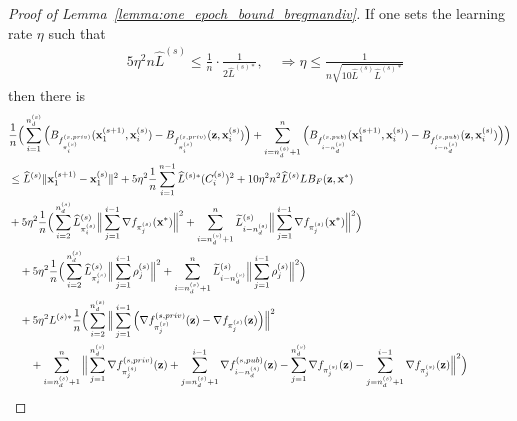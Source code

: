 \begin{proof}[Proof of Lemma~\ref{lemma:one_epoch_bound_bregmandiv}]
    If one sets the learning rate $\eta$ such that
    \begin{align}
        &5 \eta^2 n \widehat{L}^{(s)} \leq \frac{1}{n} \cdot \frac{1}{2 \widehat{L}^{(s)*}}, \quad
        \Rightarrow \eta \leq \frac{1}{n\sqrt{10 \widehat{L}^{(s)} \widehat{L}^{(s)*}}}
    \end{align}
    then there is
    \begin{align}
        &\frac{1}{n} \Big(\sum_{i=1}^{n_d^{(s)}}
        \Big( B_{f_{\pi_i^{(s)}}^{(s, priv)}}({\mathbf{x}}_{1}^{(s+1)}, {\mathbf{x}}_i^{(s)})
        - B_{f_{\pi_i^{(s)}}^{(s, priv)}}({\mathbf{z}}, {\mathbf{x}}_i^{(s)}) \Big)
        + \sum_{i=n_d^{(s)}+1}^{n}\Big(
            B_{f_{i-n_d^{(s)}}^{(s,pub)}}({\mathbf{x}}_1^{(s+1)}, {\mathbf{x}}_i^{(s)})
            - B_{f_{i-n_d^{(s)}}^{(s, pub)}}({\mathbf{z}}, {\mathbf{x}}_i^{(s)})
        \Big)
        \Big) \\
        \nonumber
        &\leq \widehat{L}^{(s)} \|{\mathbf{x}}_{1}^{(s+1)} - {\mathbf{x}}_1^{(s)}\|^2
        + 5 \eta^2 \frac{1}{n} \sum_{i=1}^{n-1} \widehat{L}^{(s)*} (C_i^{(s)})^2
        + 10\eta^2 n^2 \widehat{L}^{(s)} L B_F({\mathbf{z}}, {\mathbf{x}}^*)
        \\
        \nonumber
        &
        + 5 \eta^2 \frac{1}{n} \Big(\sum_{i=2}^{n_d^{(s)}}\widehat{L}_{\pi_i^{(s)}}^{(s)}\Big\| \sum_{j=1}^{i-1} \nabla f_{\pi_j^{(s)}}({\mathbf{x}}^*)\Big\|^2
        + \sum_{i=n_d^{(s)}+1}^{n}\widetilde{L}_{i-n_d^{(s)}}^{(s)}\Big\| \sum_{j=1}^{i-1}\nabla f_{\pi_j^{(s)}}({\mathbf{x}}^*)\Big\|^2 \Big)\\
        \nonumber
        &\quad 
        + 5\eta^2 \frac{1}{n} \Big( \sum_{i=2}^{n_d^{(s)}} \widehat{L}_{\pi_i^{(s)}}^{(s)} \Big\| \sum_{j=1}^{i-1} \rho_j^{(s)}\Big\|^2
        + \sum_{i=n_d^{(s)}+1}^{n} \widetilde{L}_{i-n_d^{(s)}}^{(s)}\Big\| \sum_{j=1}^{i-1} \rho_j^{(s)}\Big\|^2\Big)\\
        \nonumber
        \nonumber
        &\quad + 5\eta^2 L^{(s)*} \frac{1}{n}\Big(\sum_{i=2}^{n_d^{(s)}}
        \Big\| \sum_{j=1}^{i-1} \Big( \nabla f_{\pi_j^{(s)}}^{(s, priv)}({\mathbf{z}}) - \nabla f_{\pi_j^{(s)}}({\mathbf{z}})\Big) \Big\|^2
        \\
        \nonumber
        &\quad \quad + \sum_{i=n_d^{(s)} + 1}^{n} \Big\| \sum_{j=1}^{n_d^{(s)}} \nabla f_{\pi_j^{(s)}}^{(s, priv)}({\mathbf{z}}) + \sum_{j=n_d^{(s)}+1}^{i-1} \nabla f_{i-n_d^{(s)}}^{(s, pub)}({\mathbf{z}})
            - \sum_{j=1}^{n_d^{(s)}} \nabla f_{\pi_j^{(s)}}({\mathbf{z}}) - \sum_{j=n_d^{(s)}+1}^{i-1} \nabla f_{\pi_j^{(s)}}({\mathbf{z}})
        \Big\|^2
        \Big)
    \end{align}
    
\end{proof}


